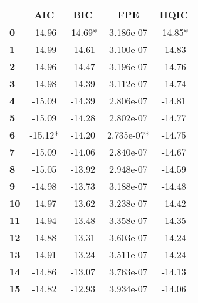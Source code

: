 \begin{center}
\begin{tabular}{lcccc}
\toprule
            & \textbf{AIC} & \textbf{BIC} & \textbf{FPE} & \textbf{HQIC}  \\
\midrule
\textbf{0}  &      -14.96  &     -14.69*  &   3.186e-07  &      -14.85*   \\
\textbf{1}  &      -14.99  &      -14.61  &   3.100e-07  &       -14.83   \\
\textbf{2}  &      -14.96  &      -14.47  &   3.196e-07  &       -14.76   \\
\textbf{3}  &      -14.98  &      -14.39  &   3.112e-07  &       -14.74   \\
\textbf{4}  &      -15.09  &      -14.39  &   2.806e-07  &       -14.81   \\
\textbf{5}  &      -15.09  &      -14.28  &   2.802e-07  &       -14.77   \\
\textbf{6}  &     -15.12*  &      -14.20  &  2.735e-07*  &       -14.75   \\
\textbf{7}  &      -15.09  &      -14.06  &   2.840e-07  &       -14.67   \\
\textbf{8}  &      -15.05  &      -13.92  &   2.948e-07  &       -14.59   \\
\textbf{9}  &      -14.98  &      -13.73  &   3.188e-07  &       -14.48   \\
\textbf{10} &      -14.97  &      -13.62  &   3.238e-07  &       -14.42   \\
\textbf{11} &      -14.94  &      -13.48  &   3.358e-07  &       -14.35   \\
\textbf{12} &      -14.88  &      -13.31  &   3.603e-07  &       -14.24   \\
\textbf{13} &      -14.91  &      -13.24  &   3.511e-07  &       -14.24   \\
\textbf{14} &      -14.86  &      -13.07  &   3.763e-07  &       -14.13   \\
\textbf{15} &      -14.82  &      -12.93  &   3.934e-07  &       -14.06   \\
\bottomrule
\end{tabular}
\end{center}